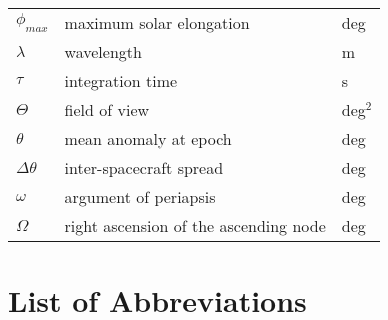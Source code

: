 \begin{table}[h!]
\begin{tabular}{l|l|l}
$\phi_{max}$         & maximum solar elongation                 & deg           \\
$\lambda$          & wavelength                               & m             \\
$\tau$             & integration time                         & s             \\
$\Theta$           & field of view                            & deg$^2$          \\
$\theta$           & mean anomaly at epoch                    & deg           \\
$\Delta \theta$     & inter-spacecraft spread                  & deg           \\
$\omega$           & argument of periapsis                    & deg           \\
$\Omega$           & right ascension of the ascending node    & deg          
\end{tabular}
\end{table}

\chapter*{List of Abbreviations}

